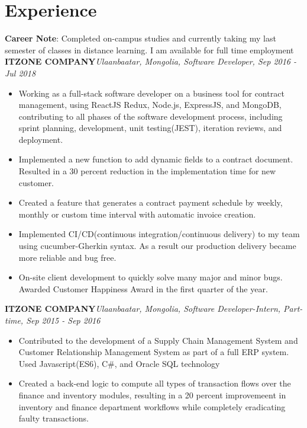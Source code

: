\documentclass[letterpaper,11pt]{article}
\newcommand{\resumeItemListStart}{\begin{itemize}}
\newcommand{\resumeItemListEnd}{\end{itemize}\vspace{-5pt}}
\begin{document}
\section{Experience}
  \textbf{Career Note}{: Completed on-campus studies and currently taking my last semester of classes in distance learning. I am available for full time employment}
  \vfill
      \textbf{ITZONE COMPANY}\hfill \textit{Ulaanbaatar, Mongolia, Software Developer, Sep 2016 - Jul 2018}
      \resumeItemListStart
        \item{
          Working as a full-stack software developer on a business tool for contract management, using ReactJS
          Redux, Node.js, ExpressJS, and MongoDB, contributing to all phases of the software development
          process, including sprint planning, development, unit testing(JEST), iteration reviews, and deployment.
        }
        \item{
          Implemented a new function to add dynamic fields to a contract document. Resulted in a 30 percent
          reduction in the implementation time for new customer.
        }
        \item{
          Created a feature that generates a contract payment schedule by weekly, monthly or custom time
          interval with automatic invoice creation.
        }
        \item{
          Implemented CI/CD(continuous integration/continuous delivery) to my team using cucumber-Gherkin
          syntax. As a result our production delivery became more reliable and bug free.
        }
        \item{
          On-site client development to quickly solve many major and minor bugs. Awarded Customer Happiness Award in the first quarter of the year.
        }
      \resumeItemListEnd

      \vfill
      \textbf{ITZONE COMPANY}\hfill \textit{Ulaanbaatar, Mongolia, Software Developer-Intern, Part-time, Sep 2015 - Sep 2016}
      \resumeItemListStart
        \item{
          Contributed to the development of a Supply Chain Management System and
          Customer Relationship Management System as part of a full ERP system. Used Javascript(ES6), C\#,
          and Oracle SQL technology
        }
        \item{
          Created a back-end logic to compute all types of transaction flows over the finance and inventory modules,
          resulting in a 20 percent improvemeent in inventory and finance department workflows while completely eradicating faulty transactions.
        }
      \resumeItemListEnd
  
\end{document}
